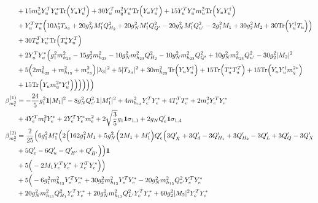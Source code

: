{\begin{align}
 &+15 {m_u^2  Y_{u}^{T}  Y_u^*} \mbox{Tr}\Big({Y_u  Y_{u}^{\dagger}}\Big) +30 {Y_{u}^{T}  m_q^2  Y_u^*} \mbox{Tr}\Big({Y_u  Y_{u}^{\dagger}}\Big) +15 {Y_{u}^{T}  Y_u^*  m_u^2} \mbox{Tr}\Big({Y_u  Y_{u}^{\dagger}}\Big) \nonumber \\ 
 &+{Y_{u}^{T}  T_u^*} \Big(10 \lambda_3^* T_{\lambda_3}  + 20 g_{N}^{2} M_1' Q_{H_2}^{2}  + 20 g_{N}^{2} M_1' Q_{Q'}^{2}  -20 g_{N}^{2} M_1' Q_{u'}^{2}  -2 g_{1}^{2} M_1  + 30 g_{2}^{2} M_2  + 30 \mbox{Tr}\Big({Y_{u}^{\dagger}  T_u}\Big) \Big)\nonumber \\ 
 &+30 {T_{u}^{T}  Y_u^*} \mbox{Tr}\Big({T_u^*  Y_{u}^{T}}\Big) \nonumber \\ 
 &+2 {Y_{u}^{T}  Y_u^*} \Big(g_{1}^{2} m_{h_{23}}^2 -15 g_{2}^{2} m_{h_{23}}^2 -10 g_{N}^{2} m_{h_{23}}^2 Q_{H_2}^{2} -10 g_{N}^{2} m_{h_{23}}^2 Q_{Q'}^{2} +10 g_{N}^{2} m_{h_{23}}^2 Q_{u'}^{2} -30 g_{2}^{2} |M_2|^2 \nonumber \\ 
 &+5 \Big(2 m_{h_{23}}^2  + m_{h_{13}}^2 + m_{s_3}^2\Big)|\lambda_3|^2 +5 |T_{\lambda_3}|^2 +30 m_{h_{23}}^2 \mbox{Tr}\Big({Y_u  Y_{u}^{\dagger}}\Big) +15 \mbox{Tr}\Big({T_u^*  T_{u}^{T}}\Big) +15 \mbox{Tr}\Big({Y_u  Y_{u}^{\dagger}  m_q^{2 *}}\Big) \nonumber \\ 
 &+15 \mbox{Tr}\Big({Y_u  m_u^{2 *}  Y_{u}^{\dagger}}\Big) \Big)\Big)\Big)\Big)\Big)\\ 
\beta_{m_e^2}^{(1)} & =  
-\frac{24}{5} g_{1}^{2} {\bf 1} |M_1|^2 -8 g_{N}^{2} Q_{e'}^{2} {\bf 1} |M_1'|^2 +4 m_{h_{13}}^2 {Y_{e}^{T}  Y_e^*} +4 {T_{e}^{T}  T_e^*} +2 {m_e^2  Y_{e}^{T}  Y_e^*} \nonumber \\ 
 &+4 {Y_{e}^{T}  m_l^2  Y_e^*} +2 {Y_{e}^{T}  Y_e^*  m_e^2} +2 \sqrt{\frac{3}{5}} g_1 {\bf 1} \sigma_{1,1} +2 g_N Q_e' {\bf 1} \sigma_{1,4} \\ 
\beta_{m_e^2}^{(2)} & =  
\frac{2}{25} \Big(6 g_{1}^{2} M_1^* \Big(2 \Big(162 g_{1}^{2} M_1  + 5 g_{N}^{2} \Big(2 M_1  + M_1'\Big)Q_e' \Big(3 Q_{\bar{X}}'  + 3 Q_d'  -3 Q_{H_1}'  + 3 Q_{H_2}'  -3 Q_L'  + 3 Q_Q'  -3 Q_X' \nonumber\\
& + 5 Q_e'  -6 Q_u'  - Q_{H'}'  + Q_{\bar{H}'}'\Big)\Big){\bf 1} \nonumber \\ 
 &+5 \Big(-2 M_1 {Y_{e}^{T}  Y_e^*}  + {T_{e}^{T}  Y_e^*}\Big)\Big)\nonumber \\ 
 &+5 \Big(-6 g_{1}^{2} m_{h_{13}}^2 {Y_{e}^{T}  Y_e^*} +30 g_{2}^{2} m_{h_{13}}^2 {Y_{e}^{T}  Y_e^*} -20 g_{N}^{2} m_{h_{13}}^2 Q_{e'}^{2} {Y_{e}^{T}  Y_e^*} \nonumber \\ 
 &+20 g_{N}^{2} m_{h_{13}}^2 Q_{H_1}^{2} {Y_{e}^{T}  Y_e^*} +20 g_{N}^{2} m_{h_{13}}^2 Q_{L'}^{2} {Y_{e}^{T}  Y_e^*} +60 g_{2}^{2} |M_2|^2 {Y_{e}^{T}  Y_e^*} \nonumber \\ 

\end{align}}
